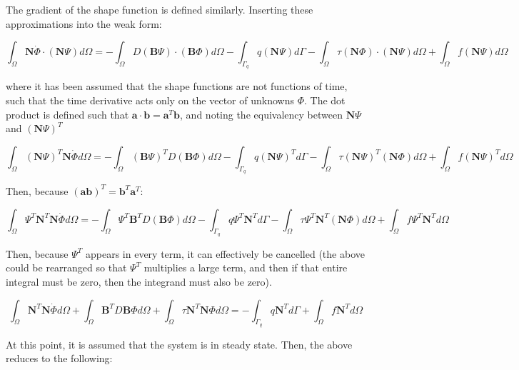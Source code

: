 \documentclass[10pt]{article}
\begin{document}
The gradient of the shape function is defined similarly. Inserting these approximations into the weak form:

\begin{equation}
\label{eq:FEStep1}
\int_{\Omega}\textbf{N}\dot{\Phi}\cdot(\textbf{N}\Psi)d\Omega=-\int_{\Omega}D(\textbf{B}\Psi)\cdot(\textbf{B}\Phi)d\Omega-\int_{\Gamma_q}q(\textbf{N}\Psi)d\Gamma-\int_{\Omega}\tau (\textbf{N}\Phi)\cdot(\textbf{N}\Psi)d\Omega+\int_{\Omega}f(\textbf{N}\Psi)d\Omega
\end{equation}

where it has been assumed that the shape functions are not functions of time, such that the time derivative acts only on the vector of unknowns \(\Phi\). The dot product is defined such that \(\textbf{a}\cdot\textbf{b}=\textbf{a}^T\textbf{b}\), and noting the equivalency between \(\textbf{N}\Psi\) and \((\textbf{N}\Psi)^T\)

\begin{equation}
\int_{\Omega}(\textbf{N}\Psi)^T\textbf{N}\dot{\Phi}d\Omega=-\int_{\Omega}(\textbf{B}\Psi)^TD(\textbf{B}\Phi)d\Omega-\int_{\Gamma_q}q(\textbf{N}\Psi)^Td\Gamma-\int_{\Omega}\tau (\textbf{N}\Psi)^T(\textbf{N}\Phi)d\Omega+\int_{\Omega}f(\textbf{N}\Psi)^Td\Omega
\end{equation}

Then, because \((\textbf{a}\textbf{b})^T=\textbf{b}^T\textbf{a}^T\):

\begin{equation}
\int_{\Omega}\Psi^T\textbf{N}^T\textbf{N}\dot{\Phi}d\Omega=-\int_{\Omega}\Psi^T\textbf{B}^TD(\textbf{B}\Phi)d\Omega-\int_{\Gamma_q}q\Psi^T\textbf{N}^Td\Gamma-\int_{\Omega}\tau \Psi^T\textbf{N}^T(\textbf{N}\Phi)d\Omega+\int_{\Omega}f\Psi^T\textbf{N}^Td\Omega
\end{equation}

Then, because \(\Psi^T\) appears in every term, it can effectively be cancelled (the above could be rearranged so that \(\Psi^T\) multiplies a large term, and then if that entire integral must be zero, then the integrand must also be zero). 

\begin{equation}
\int_{\Omega}\textbf{N}^T\textbf{N}\dot{\Phi}d\Omega+\int_{\Omega}\textbf{B}^TD\textbf{B}\Phi d\Omega+\int_{\Omega}\tau \textbf{N}^T\textbf{N}\Phi d\Omega=-\int_{\Gamma_q}q\textbf{N}^Td\Gamma+\int_{\Omega}f\textbf{N}^Td\Omega
\end{equation}

At this point, it is assumed that the system is in steady state. Then, the above reduces to the following:
\end{document}
